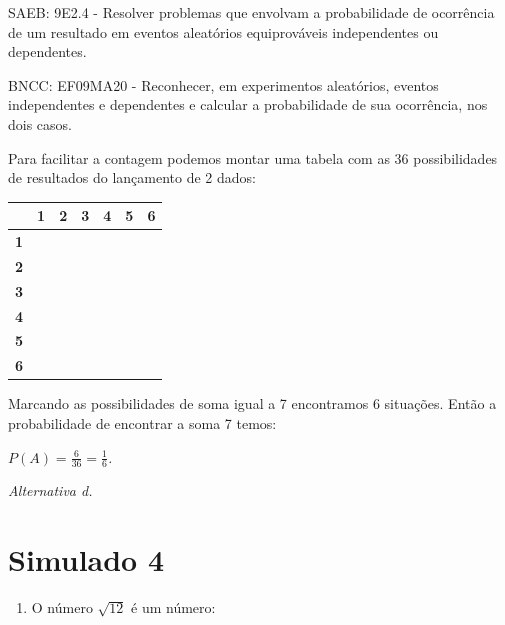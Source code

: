 \begin{escolha}
{{{\begin{escolha}
{{{{{\begin{escolha}
\begin{escolha}
{\begin{q°}
SAEB: 9E2.4 - Resolver problemas que envolvam a probabilidade de
ocorrência de um resultado em eventos aleatórios equiprováveis
independentes ou dependentes.

BNCC: EF09MA20 - Reconhecer, em experimentos aleatórios, eventos
independentes e dependentes e calcular a probabilidade de sua
ocorrência, nos dois casos.

Para facilitar a contagem podemos montar uma tabela com as 36
possibilidades de resultados do lançamento de 2 dados:

\begin{longtable}[]{@{}lllllll@{}}
\toprule\noalign{}
\textbf{~} & \textbf{1} & \textbf{2} & \textbf{3} & \textbf{4} &
\textbf{5} & \textbf{6} \\
\midrule\noalign{}
\endhead
\bottomrule\noalign{}
\endlastfoot
\textbf{1} & \textbf{~} & \textbf{~} & \textbf{~} & \textbf{~} &
\textbf{~} & \textbf{~} \\
\textbf{2} & \textbf{~} & \textbf{~} & \textbf{~} & \textbf{~} &
\textbf{~} & \textbf{~} \\
\textbf{3} & \textbf{~} & \textbf{~} & \textbf{~} & \textbf{~} &
\textbf{~} & \textbf{~} \\
\textbf{4} & \textbf{~} & \textbf{~} & \textbf{~} & \textbf{~} &
\textbf{~} & \textbf{~} \\
\textbf{5} & \textbf{~} & \textbf{~} & \textbf{~} & \textbf{~} &
\textbf{~} & \textbf{~} \\
\textbf{6} & \textbf{~} & \textbf{~} & \textbf{~} & \textbf{~} &
\textbf{~} & \textbf{~} \\
\end{longtable}

Marcando as possibilidades de soma igual a 7 encontramos 6 situações.
Então a probabilidade de encontrar a soma 7 temos:

\(P\left( A \right) = \frac{6}{36} = \frac{1}{6}\)\emph{.}

\emph{Alternativa d.}

\chapter{Simulado 4}

\begin{enumerate}
\def\labelenumi{\arabic{enumi}.}
\tightlist
\item
  O número \(\sqrt{12}\) é um número:
\end{enumerate}

\begin{enumerate}


\end{enumerate}
\end{q°}}
\end{escolha}
\end{escolha}}}}}}
\end{escolha}}}}
\end{escolha}
